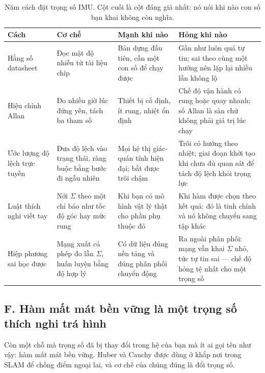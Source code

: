 \documentclass[../../deep_learning.tex]{subfiles}
\begin{document}
\begin{table}[H]\centering\footnotesize
\caption{Năm cách đặt trọng số IMU. Cột cuối là cột đáng giá nhất: nó nói khi nào con số bạn khai không còn nghĩa.}
\label{tab:f34-trong-so}
\begin{tabularx}{\linewidth}{@{}L{2.5cm}L{3.3cm}YL{3.5cm}@{}}
\toprule
\textbf{Cách} & \textbf{Cơ chế} & \textbf{Mạnh khi nào} & \textbf{Hỏng khi nào}\\
\midrule
Hằng số datasheet & Đọc mật độ nhiễu từ tài liệu chip & Bản dựng đầu tiên, cần một con số để chạy được & Gần như luôn quá tự tin; sai theo cùng một hướng nên lặp lại nhiều lần không lộ\\
Hiệu chỉnh Allan & Đo nhiều giờ lúc đứng yên, tách ba tham số & Thiết bị cố định, ít rung, nhiệt ổn định & Chế độ vận hành có rung hoặc quay nhanh; số Allan là sàn chứ không phải giá trị lúc chạy\\
Ước lượng độ lệch trực tuyến & Đưa độ lệch vào trạng thái, ràng buộc bằng bước đi ngẫu nhiên & Mọi hệ thị giác-quán tính hiện đại; bắt được trôi chậm & Trôi có hướng theo nhiệt; giai đoạn khởi tạo khi chưa đủ quan sát để tách độ lệch khỏi trọng lực\\
Luật thích nghi viết tay & Nới \(\Sigma\) theo một chỉ báo như tốc độ góc hay mức rung & Khi bạn có mô hình vật lý thật cho phần phụ thuộc đó & Khi hàm được chọn theo kết quả: đó là tinh chỉnh và nó không chuyển sang tập khác\\
Hiệp phương sai học được & Mạng xuất cả phép đo lẫn \(\Sigma\), huấn luyện bằng độ hợp lý & Có dữ liệu đúng nền tảng và đúng phân phối chuyển động & Ra ngoài phân phối: mạng vẫn khai \(\Sigma\) nhỏ, tức tự tin sai --- chế độ hỏng tệ nhất cho một trọng số\\
\bottomrule
\end{tabularx}
\end{table}


\subsection{F. Hàm mất mát bền vững là một trọng số thích nghi trá hình}

Còn một chỗ mà trọng số đã bị thay đổi trong hệ của bạn mà ít ai gọi tên như vậy: hàm mất mát bền vững. Huber và Cauchy được dùng ở khắp nơi trong SLAM để chống điểm ngoại lai, và cơ chế của chúng đúng là đổi trọng số.
\end{document}
